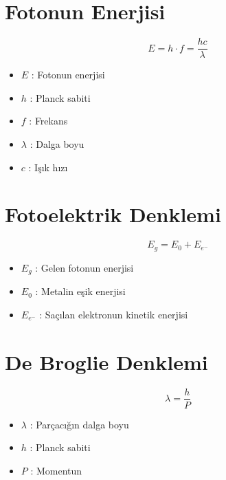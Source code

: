 \documentclass[a4paper, 11pt, titlepage]{article}
\begin{document}
\section{Fotonun Enerjisi}
\[
E = h \cdot f = \frac{h c}{\lambda}
\]
\begin{itemize}
  \item $E$ : Fotonun enerjisi
  \item $h$ : Planck sabiti
  \item $f$ : Frekans
  \item $\lambda$ : Dalga boyu
  \item $c$ : Işık hızı
\end{itemize}

\section{Fotoelektrik Denklemi}
\[
E_g = E_0 + E_{e^-}
\]
\begin{itemize}
  \item $E_g$ : Gelen fotonun enerjisi
  \item $E_0$ : Metalin eşik enerjisi
  \item $E_{e^-}$ : Saçılan elektronun kinetik enerjisi
\end{itemize}

\section{De Broglie Denklemi}
\[
\lambda = \frac{h}{P}
\]
\begin{itemize}
  \item $\lambda$ : Parçacığın dalga boyu
  \item $h$ : Planck sabiti
  \item $P$ : Momentun
\end{itemize}
\end{document}
